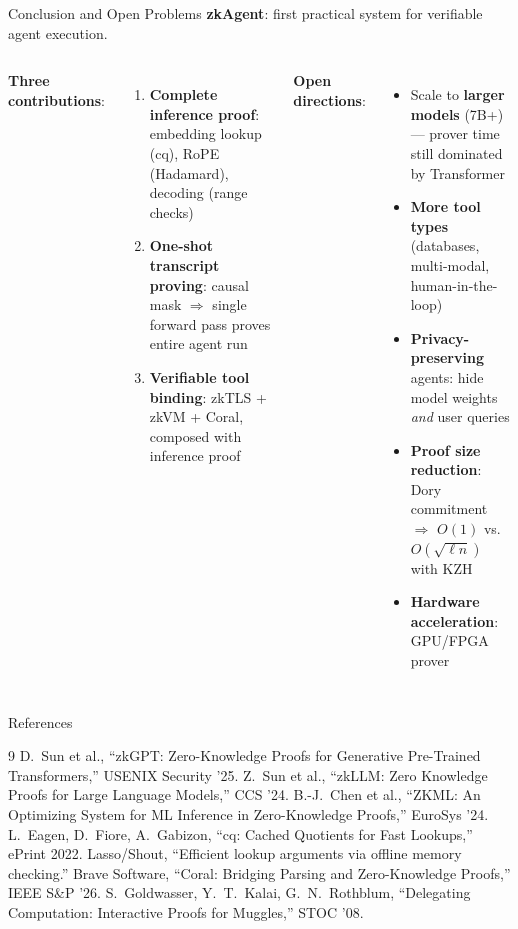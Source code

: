 \documentclass[aspectratio=169,10pt]{beamer}
\newcommand{\pos}[1]{\textcolor{positive}{#1}}
\begin{document}
\begin{frame}{Conclusion and Open Problems}
\textbf{zkAgent}: first practical system for \pos{verifiable agent execution}.

\vspace{4pt}
\begin{columns}[T]
\textbf{Three contributions}:
\begin{enumerate}
  \item \textbf{Complete inference proof}: embedding lookup (cq), RoPE (Hadamard), decoding (range checks)
  \item \textbf{One-shot transcript proving}: causal mask $\Rightarrow$ single forward pass proves entire agent run
  \item \textbf{Verifiable tool binding}: zkTLS + zkVM + Coral, composed with inference proof
\end{enumerate}

\textbf{Open directions}:
\begin{itemize}
  \item Scale to \textbf{larger models} (7B+) --- prover time still dominated by Transformer
  \item \textbf{More tool types} (databases, multi-modal, human-in-the-loop)
  \item \textbf{Privacy-preserving} agents: hide model weights \emph{and} user queries
  \item \textbf{Proof size reduction}: Dory commitment $\Rightarrow$ $O(1)$ vs.\ $O(\sqrt{\ell n})$ with KZH
  \item \textbf{Hardware acceleration}: GPU/FPGA prover
\end{itemize}
\end{columns}
\end{frame}

\begin{frame}{References}
\begin{thebibliography}{9}
\small
{} D.\ Sun et al., ``zkGPT: Zero-Knowledge Proofs for Generative Pre-Trained Transformers,'' USENIX Security '25.
 Z.\ Sun et al., ``zkLLM: Zero Knowledge Proofs for Large Language Models,'' CCS '24.
 B.-J.\ Chen et al., ``ZKML: An Optimizing System for ML Inference in Zero-Knowledge Proofs,'' EuroSys '24.
 L.\ Eagen, D.\ Fiore, A.\ Gabizon, ``cq: Cached Quotients for Fast Lookups,'' ePrint 2022.
 Lasso/Shout, ``Efficient lookup arguments via offline memory checking.''
 Brave Software, ``Coral: Bridging Parsing and Zero-Knowledge Proofs,'' IEEE S\&P '26.
 S.\ Goldwasser, Y.\ T.\ Kalai, G.\ N.\ Rothblum, ``Delegating Computation: Interactive Proofs for Muggles,'' STOC '08.
\end{thebibliography}
\end{frame}
\end{document}
